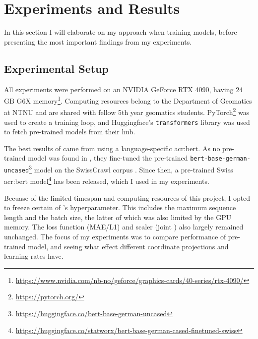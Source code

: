\section{Experiments and Results}
\label{sec:Experiments}

\begin{comment}
Trying and failing is a major part of research.
However, to have a chance of success you need a plan driving the experimental research.
So first decide what experiments or series of experiments you plan --- and describe them in this section.
\end{comment}

In this section I will elaborate on my approach when training models, before presenting the most important findings from my experiments.

\subsection{Experimental Setup}
\label{sec:experimentalSetup}


All experiments were performed on an NVIDIA GeForce RTX 4090, having 24 GB G6X memory\footnote{\url{https://www.nvidia.com/nb-no/geforce/graphics-cards/40-series/rtx-4090/}}. Computing resources belong to the Department of Geomatics at NTNU and are shared with fellow 5th year geomatics students. PyTorch\footnote{\url{https://pytorch.org/}} was used to create a training loop, and Huggingface's \texttt{transformers} library was used to fetch pre-trained models from their hub.

The best results of \cite{scherrerHeLjuVarDial20202020} came from using a language-specific \acrshort{acr:bert}. As no pre-trained model was found in \citeyear{scherrerHeLjuVarDial20202020}, they fine-tuned the pre-trained \texttt{bert-base-german-uncased}\footnote{\url{https://huggingface.co/bert-base-german-uncased}} model on the SwissCrawl corpus \citep[3-4]{scherrerHeLjuVarDial20202020}. Since then, a pre-trained Swiss \acrshort{acr:bert} model\footnote{\url{https://huggingface.co/statworx/bert-base-german-cased-finetuned-swiss}} has been released, which I used in my experiments.

Becuase of the limited timespan and computing resources of this project, I opted to freeze certain of \citeauthor{scherrerHeLjuVarDial20202020}'s hyperparameter. This includes the maximum sequence length and the batch size, the latter of which was also limited by the GPU memory. The loss function (MAE/L1) and scaler (joint \citep[5]{scherrerHeLjuVarDial20202020}) also largely remained unchanged. The focus of my experiments was to compare performance of pre-trained model, and seeing what effect different coordinate projections and learning rates have.

